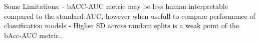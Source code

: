 Some Limitations: 
- bACC-AUC metric may be less human interpretable compared to the standard AUC, 
however when usefull to compare performance of classification models
- Higher SD across random splits is a weak point of the bAcc-AUC metric..









